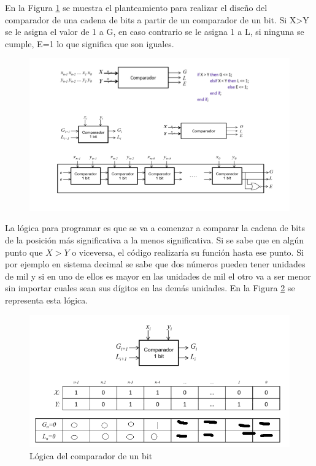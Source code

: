 \documentclass[12pt,letterpaper]{book}
\begin{document}
\begin{multicols}{2}

En la Figura \ref{p2} se muestra el planteamiento para realizar el diseño del comparador de una cadena de bits a partir de un comparador de un bit. Si X>Y se le asigna el valor de 1 a  G, en caso contrario se le asigna 1 a L, si ninguna se cumple, E=1 lo que significa que son iguales. 


\begin{figure}[H]
\centering
\includegraphics[width=1\linewidth]{figures/p2.png}
\caption{}
\label{p2}
\end{figure}
\vspace{0.2cm}

La lógica para programar es que se va a comenzar a comparar la cadena de bits de la posición más significativa a la menos significativa. Si se sabe que en algún punto que $X>Y$ o viceversa, el código realizaría su función hasta ese punto. Si por ejemplo en sistema decimal se sabe que dos números pueden tener unidades de mil y si en uno de ellos es mayor en las unidades de mil el otro va a ser menor sin importar cuales sean sus dígitos en las demás unidades. En la Figura \ref{p3} se representa esta lógica. 

\begin{figure}[H]
\centering
\includegraphics[width=1\linewidth]{figures/p3.png}
\caption{Lógica del comparador de un bit}
\label{p3}
\end{figure}
\vspace{0.2cm}


\end{multicols}
\end{document}
